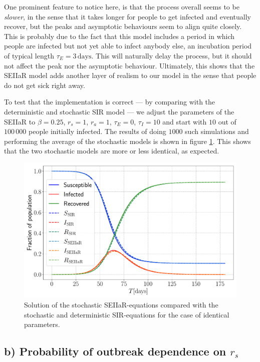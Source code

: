 One prominent feature to notice here, is that the process overall seems to be \textit{slower}, in the sense that it takes longer for people to get infected and eventually recover, but the peaks and asymptotic behaviours seem to align quite closely. This is probably due to the fact that this model includes a period in which people are infected but not yet able to infect anybody else, an incubation period of typical length $\tau_E = 3 \, \mathrm{days}$. This will naturally delay the process, but it should not affect the peak nor the asymptotic behaviour. Ultimately, this shows that the SEIIaR model adds another layer of realism to our model in the sense that people do not get sick right away.

To test that the implementation is correct --- by comparing with the deterministic and stochastic SIR model --- we adjust the parameters of the SEIIaR to $\beta = 0.25$, $r_s = 1$, $r_a = 1$, $\tau_E = 0$, $\tau_I= 10$ and start with $10$ out of $100 \, 000$ people initially infected. The results of doing $1000$ such simulations and performing the average of the stochastic models is shown in figure \ref{fig:comparison_SIR}. This shows that the two stochastic models are more or less identical, as expected.

\begin{figure}[htb]
	\centering
	\includegraphics[width=0.8\columnwidth]{../fig/test_comparison.pdf}
	\caption{Solution of the stochastic SEIIaR-equations compared with the stochastic and deterministic SIR-equations for the case of identical parameters.}
	\label{fig:comparison_SIR}
\end{figure}

\subsection{b) Probability of outbreak dependence on $r_s$}

